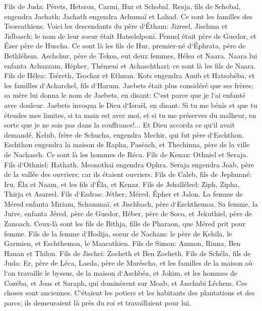 \verse Fils de Juda: Pérets, Hetsron, Carmi, Hur et Schobal. 
\verse Reaja, fils de Schobal, engendra Jachath; Jachath engendra Achumaï et Lahad. Ce sont les familles des Tsoreathiens. 
\verse Voici les descendants du père d`Étham: Jizreel, Jischma et Jidbasch; le nom de leur soeur était Hatselelponi. 
\verse Penuel était père de Guedor, et Ézer père de Huscha. Ce sont là les fils de Hur, premier-né d`Éphrata, père de Bethléhem. 
\verse Aschchur, père de Tekoa, eut deux femmes, Hélea et Naara. 
\verse Naara lui enfanta Achuzzam, Hépher, Thémeni et Achaschthari: ce sont là les fils de Naara. 
\verse Fils de Hélea: Tséreth, Tsochar et Ethnan. 
\verse Kots engendra Anub et Hatsobéba, et les familles d`Acharchel, fils d`Harum. 
\verse Jaebets était plus considéré que ses frères; sa mère lui donna le nom de Jaebets, en disant: C`est parce que je l`ai enfanté avec douleur. 
\verse Jaebets invoqua le Dieu d`Israël, en disant: Si tu me bénis et que tu étendes mes limites, si ta main est avec moi, et si tu me préserves du malheur, en sorte que je ne sois pas dans la souffrance!... Et Dieu accorda ce qu`il avait demandé. 
\verse Kelub, frère de Schucha, engendra Mechir, qui fut père d`Eschthon. 
\verse Eschthon engendra la maison de Rapha, Paséach, et Thechinna, père de la ville de Nachasch. Ce sont là les hommes de Réca. 
\verse Fils de Kenaz: Othniel et Seraja. Fils d`Othniel: Hathath. 
\verse Meonothaï engendra Ophra. Seraja engendra Joab, père de la vallée des ouvriers; car ils étaient ouvriers. 
\verse Fils de Caleb, fils de Jephunné: Iru, Éla et Naam, et les fils d`Éla, et Kenaz. 
\verse Fils de Jehalléleel: Ziph, Zipha, Thirja et Asareel. 
\verse Fils d`Esdras: Jéther, Méred, Épher et Jalon. La femme de Méred enfanta Miriam, Schammaï, et Jischbach, père d`Eschthemoa. 
\verse Sa femme, la Juive, enfanta Jéred, père de Guedor, Héber, père de Soco, et Jekuthiel, père de Zanoach. Ceux-là sont les fils de Bithja, fille de Pharaon, que Méred prit pour femme. 
\verse Fils de la femme d`Hodija, soeur de Nacham: le père de Kehila, le Garmien, et Eschthemoa, le Maacathien. 
\verse Fils de Simon: Amnon, Rinna, Ben Hanan et Thilon. Fils de Jischeï: Zocheth et Ben Zocheth. 
\verse Fils de Schéla, fils de Juda: Er, père de Léca, Laeda, père de Maréscha, et les familles de la maison où l`on travaille le byssus, de la maison d`Aschbéa, 
\verse et Jokim, et les hommes de Cozéba, et Joas et Saraph, qui dominèrent sur Moab, et Jaschubi Léchem. Ces choses sont anciennes. 
\verse C`étaient les potiers et les habitants des plantations et des parcs; ils demeuraient là près du roi et travaillaient pour lui. 
